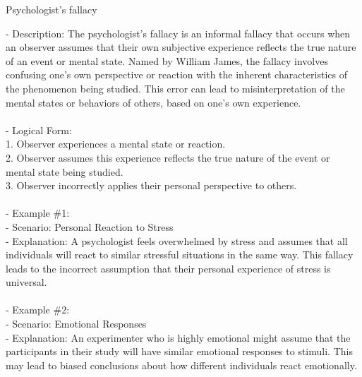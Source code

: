 \documentclass[a4paper,12pt,single,pdftex]{scrartcl}
\begin{document}
Psychologist's fallacy
    
      - Description: The psychologist's fallacy is an informal fallacy that occurs when an observer assumes that their own subjective experience reflects the true nature of an event or mental state. Named by William James, the fallacy involves confusing one's own perspective or reaction with the inherent characteristics of the phenomenon being studied. This error can lead to misinterpretation of the mental states or behaviors of others, based on one's own experience.
    \\

    
      
    \\

    
      - Logical Form:
    \\

    
        1. Observer experiences a mental state or reaction.
    \\

    
        2. Observer assumes this experience reflects the true nature of the event or mental state being studied.
    \\

    
        3. Observer incorrectly applies their personal perspective to others.
    \\

    
      
    \\

    
      - Example \#1:
    \\

    
        - Scenario: Personal Reaction to Stress
    \\

    
        - Explanation: A psychologist feels overwhelmed by stress and assumes that all individuals will react to similar stressful situations in the same way. This fallacy leads to the incorrect assumption that their personal experience of stress is universal.
    \\

    
      
    \\

    
      - Example \#2:
    \\

    
        - Scenario: Emotional Responses
    \\

    
        - Explanation: An experimenter who is highly emotional might assume that the participants in their study will have similar emotional responses to stimuli. This may lead to biased conclusions about how different individuals react emotionally.
    \\
\end{document}
